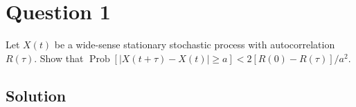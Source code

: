 \section*{Question 1}

Let \( X(t) \) be a wide-sense stationary stochastic process with autocorrelation \( R(\tau) \).
Show that \( \operatorname{Prob}[|X(t+\tau)-X(t)| \geq a]<2[R(0)-R(\tau)] / a^{2} \).

\subsection*{Solution}
